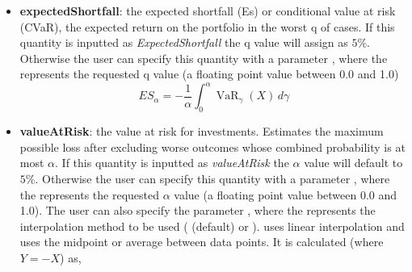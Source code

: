 \begin{itemize}
\begin{itemize}
  \item \textbf{expectedShortfall}: the expected shortfall (Es) or conditional value at risk (CVaR), the expected return on the portfolio in the worst q of cases. If this quantity is inputted as \textit{ExpectedShortfall} the q value will assign as $5\%$. Otherwise the user can specify this quantity with a parameter , where the  represents the requested q value (a floating point value between 0.0 and 1.0)
  \begin{equation}
    ES_\alpha = -\frac{1}{\alpha} \int_0^\alpha \operatorname{VaR}_\gamma(X) \, d\gamma
  \end{equation}
  \item \textbf{valueAtRisk}: the value at risk for investments. Estimates the maximum possible loss
  after excluding worse outcomes whose combined probability is at most $\alpha$. If this quantity is
  inputted as \textit{valueAtRisk} the $\alpha$ value will default to $5\%$. Otherwise the user can
  specify this quantity with a parameter , where the  represents
  the requested $\alpha$ value (a floating point value between 0.0 and 1.0). The user can also specify
  the parameter , where the  represents the interpolation method
  to be used ( (default) or ).  uses linear
  interpolation and  uses the midpoint or average between data points. It is
  calculated (where $ Y = -X $) as,


\end{itemize}
\end{itemize}
